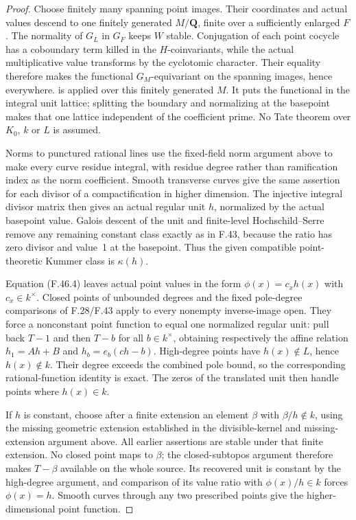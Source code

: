 \begin{proof}
Choose finitely many spanning point images. Their coordinates and actual
values descend to one finitely generated \(M/\mathbf Q\), finite over
a sufficiently enlarged \(F\). The normality of \(G_L\) in \(G_F\)
keeps \(W\) stable. Conjugation of each point cocycle has a coboundary
term killed in the \(H\)-coinvariants, while the actual multiplicative
value transforms by the cyclotomic character. Their equality therefore
makes the functional \(G_M\)-equivariant on the spanning images, hence
everywhere. \citet[original Theorem~4.3(ii), p.~676]{F_Jannsen1995} is applied over
this finitely generated \(M\). It puts the functional in the integral
unit lattice; splitting the boundary and normalizing at the basepoint
makes that one lattice independent of the coefficient prime. No Tate
theorem over \(K_0\), \(k\) or \(L\) is assumed.

Norms to punctured rational lines use the fixed-field norm argument above to make every curve
residue integral, with residue degree rather than ramification index as
the norm coefficient. Smooth transverse curves give the same assertion
for each divisor of a compactification in higher dimension. The
injective integral divisor matrix then gives an actual regular unit
\(h\), normalized by the actual basepoint value. Galois descent of the
unit and finite-level Hochschild–Serre remove any remaining constant
class exactly as in F.43, because the ratio has zero divisor and value~1
at the basepoint. Thus the given compatible point-theoretic Kummer class
is \(\kappa(h)\).

Equation \textup{(F.46.4)} leaves actual point values in the form
\(\phi(x)=c_xh(x)\) with \(c_x\in k^\times\). Closed points of
unbounded degrees and the fixed pole-degree comparisons of F.28/F.43
apply to every nonempty inverse-image open. They force a nonconstant
point function to equal one normalized regular unit: pull back \(T-1\)
and then \(T-b\) for all \(b\in k^\times\), obtaining respectively
the affine relation \(h_1=Ah+B\) and
\(h_b=e_b(ch-b)\). High-degree points have \(h(x)\notin L\), hence
\(h(x)\notin k\). Their degree exceeds the combined pole bound, so the
corresponding rational-function identity is exact. The zeros of the
translated unit then handle points where \(h(x)\in k\).

If \(h\) is constant, choose after a finite extension an element
\(\beta\) with \(\beta/h\notin k\), using the missing geometric
extension established in the divisible-kernel and missing-extension argument above. All earlier assertions are stable
under that finite extension. No closed point maps to \(\beta\); the
closed-subtopos argument therefore makes \(T-\beta\) available on the
whole source. Its recovered unit is constant by the high-degree argument,
and comparison of its value ratio with \(\phi(x)/h\in k\) forces
\(\phi(x)=h\). Smooth curves through any two prescribed points give
the higher-dimensional point function.


\end{proof}
